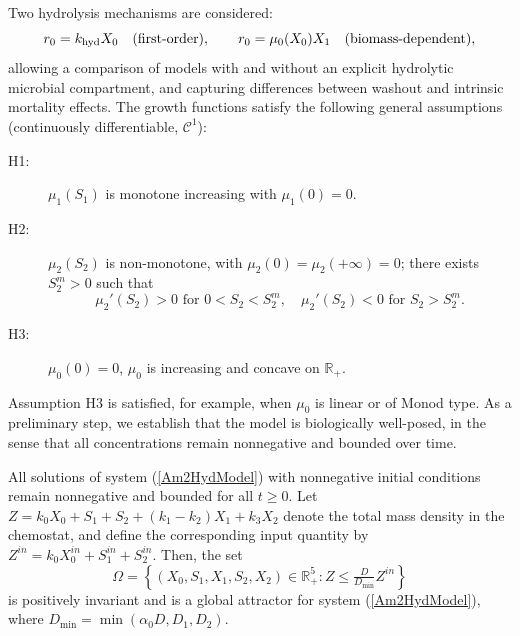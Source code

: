 \documentclass[runningheads]{llncs}
\begin{document}
Two hydrolysis mechanisms are considered:
\[
r_0 = k_{\rm hyd} X_0 \quad \text{(first-order)}, \qquad
r_0 = \mu_0(X_0) X_1 \quad \text{(biomass-dependent)},
\]
allowing a comparison of models with and without an explicit hydrolytic microbial compartment, and capturing differences between washout and intrinsic mortality effects.
The growth functions satisfy the following general assumptions (continuously differentiable, $\mathcal{C}^1$):
\begin{description}
\item[H1:] $\mu_1(S_1)$ is monotone increasing with $\mu_1(0)=0$.
\item[H2:] $\mu_2(S_2)$ is non-monotone, with $\mu_2(0)=\mu_2(+\infty)=0$; there exists $S_2^m>0$ such that
\[
\mu_2'(S_2)>0 \text{ for } 0<S_2<S_2^m, \quad
\mu_2'(S_2)<0 \text{ for } S_2>S_2^m.
\]
\item[H3:] $\mu_0(0)=0$, $\mu_0$ is increasing and concave on $\mathbb{R}_+$.
\end{description}
Assumption H3 is satisfied, for example, when $\mu_0$ is linear or of Monod type.
As a preliminary step, we establish that the model is biologically well-posed, in the sense that all concentrations remain nonnegative and bounded over time.
\begin{proposition}                               \label{PropDefModel}
All solutions of system (\ref{Am2HydModel}) with nonnegative initial conditions remain nonnegative and bounded for all $t\ge 0$. 
Let $Z = k_0 X_0 + S_1 + S_2 + (k_1 - k_2) X_1 + k_3 X_2$
denote the total mass density in the chemostat, and define the corresponding input quantity by $Z^{in} = k_0 X_0^{in} + S_1^{in} + S_2^{in}$. Then, the set
\[
\Omega = \left\{ (X_0,S_1,X_1,S_2,X_2)\in \mathbb{R}_+^5 : Z \le \tfrac{D}{D_{\min}} Z^{in} \right\}
\]
is positively invariant and is a global attractor for system (\ref{Am2HydModel}), where $D_{\min}=\min(\alpha_0 D, D_1, D_2)$.
\end{proposition}
\end{document}
